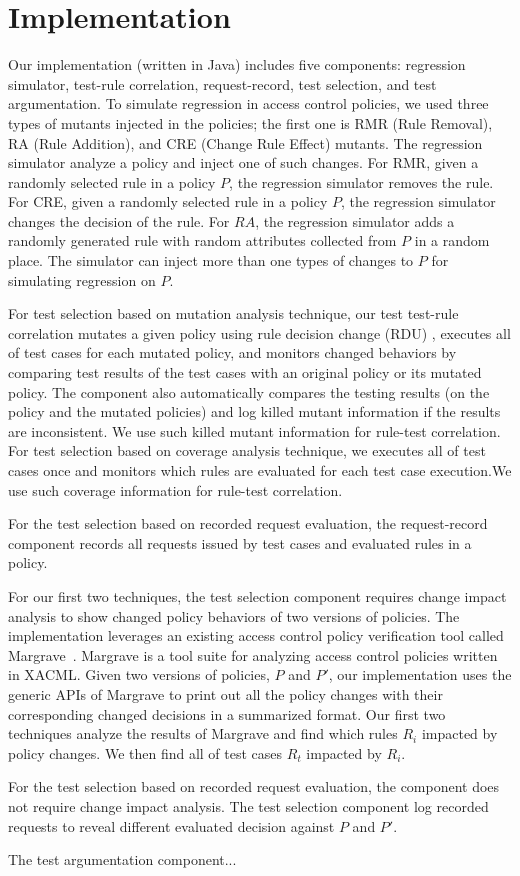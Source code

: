 \section{Implementation} \label{sec:implementation}

Our implementation (written in Java) includes five components: regression simulator, test-rule correlation, request-record, test selection,
and test argumentation. To simulate regression in access control policies, 
we used three types of mutants injected in the policies; the first one
is RMR (Rule Removal), RA (Rule Addition), and CRE (Change Rule Effect)
mutants. The regression simulator analyze a policy and inject one
of such changes. For RMR, given a randomly selected rule in a policy $P$,
the regression simulator removes the rule. For CRE,
given a randomly selected rule in a policy $P$, the regression simulator changes
the decision of the rule.
For $RA$, the regression simulator adds a randomly generated
rule with random attributes collected from $P$ in a random place.
The simulator can inject more than one types of changes to $P$ for simulating
regression on $P$.

For test selection based on mutation analysis technique,
our test test-rule correlation mutates a given policy using rule decision change (RDU)
, executes all of test cases for each mutated policy, and monitors changed
behaviors by comparing test results of the test cases with an original policy or its mutated policy.
The component also automatically compares the testing results (on the policy and the mutated
policies) and log killed mutant information if the results are inconsistent. We use
such killed mutant information for rule-test correlation.
For test selection based on coverage analysis technique,
we executes  all of test cases once and monitors
which rules are evaluated for each test case execution.We use such
coverage information for rule-test correlation.

For the test selection based on recorded request evaluation,
the request-record component records all requests issued by test cases and evaluated rules in a policy.

For our first two techniques, the test selection component requires change impact analysis to
show changed policy behaviors of two versions of policies.
The implementation leverages an existing access control policy verification tool called Margrave~\cite{fisler05:verification}. Margrave is a tool suite for analyzing access control policies written in XACML.
Given two versions of policies, $P$ and $P'$, 
our implementation uses the generic APIs of Margrave to
print out all the policy changes with their corresponding changed decisions in a summarized format.
Our first two techniques analyze the results of Margrave and
find which rules $R_i$ impacted by policy changes. We then find all of test cases $R_t$
impacted by $R_i$.

For the test selection based on recorded request evaluation,
the component does not require change impact analysis. The test selection
component log recorded requests to reveal different evaluated decision against $P$ and $P'$.

The test argumentation component...



